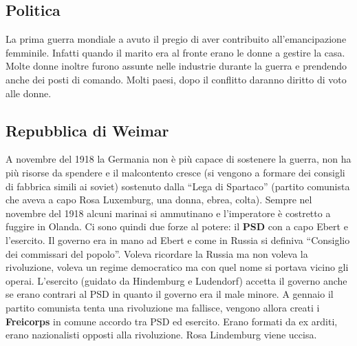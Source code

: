 \subsection{Politica}
La prima guerra mondiale a avuto il pregio di aver contribuito all'emancipazione femminile. Infatti
quando il marito era al fronte erano le donne a gestire la casa. Molte donne inoltre furono assunte
nelle industrie durante la guerra e prendendo anche dei posti di comando. Molti paesi, dopo il
conflitto daranno diritto di voto alle donne.

\subsection{Repubblica di Weimar}
A novembre del 1918 la Germania non è più capace di sostenere la guerra, non ha più risorse da 
spendere e il malcontento cresce (si vengono a formare dei consigli di fabbrica simili ai soviet)
sostenuto dalla ``Lega di Spartaco'' (partito comunista che aveva a capo Rosa Luxemburg, una donna,
ebrea, colta). Sempre nel novembre del 1918 alcuni marinai si ammutinano e l'imperatore è costretto
a fuggire in Olanda. Ci sono quindi due forze al potere: il \textbf{PSD} con a capo Ebert e 
l'esercito. Il governo era in mano ad Ebert e come in Russia si definiva ``Consiglio dei commissari 
del popolo''. Voleva ricordare la Russia ma non voleva la rivoluzione, voleva un regime democratico 
ma con quel nome si portava vicino gli operai. L'esercito (guidato da Hindemburg e Ludendorf) accetta
il governo anche se erano contrari al PSD in quanto il governo era il male minore. A gennaio il
partito comunista tenta una rivoluzione ma fallisce, vengono allora creati i \textbf{Freicorps} in
comune accordo tra PSD ed esercito. Erano formati da ex arditi, erano nazionalisti opposti alla
rivoluzione. Rosa Lindemburg viene uccisa.

